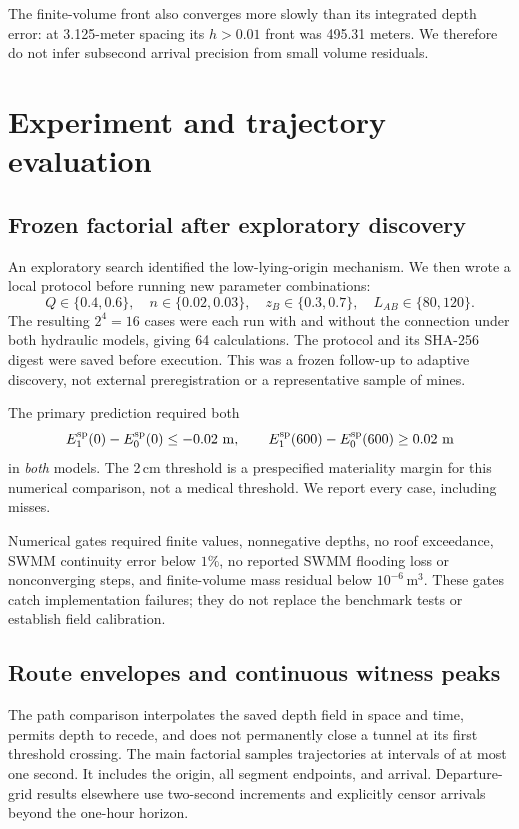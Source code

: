 \documentclass[11pt]{article}
\begin{document}
The finite-volume front also converges more slowly than its integrated depth error: at 3.125-meter spacing its \(h>0.01\) front was 495.31 meters. We therefore do not infer subsecond arrival precision from small volume residuals.

\section{Experiment and trajectory evaluation}
\subsection{Frozen factorial after exploratory discovery}
An exploratory search identified the low-lying-origin mechanism. We then wrote a local protocol before running new parameter combinations:
\[
 Q\in\{0.4,0.6\},\quad n\in\{0.02,0.03\},\quad
 z_B\in\{0.3,0.7\},\quad L_{AB}\in\{80,120\}.
\]
The resulting \(2^4=16\) cases were each run with and without the connection under both hydraulic models, giving 64 calculations. The protocol and its SHA-256 digest were saved before execution. This was a frozen follow-up to adaptive discovery, not external preregistration or a representative sample of mines.

The primary prediction required both
\begin{equation}
 E_1^{\rm sp}(0)-E_0^{\rm sp}(0)\leq-0.02\ {\rm m},
 \qquad
 E_1^{\rm sp}(600)-E_0^{\rm sp}(600)\geq0.02\ {\rm m}       \label{eq:criterion}
\end{equation}
in \emph{both} models. The 2\,cm threshold is a prespecified materiality margin for this numerical comparison, not a medical threshold. We report every case, including misses.

Numerical gates required finite values, nonnegative depths, no roof exceedance, SWMM continuity error below \(1\%\), no reported SWMM flooding loss or nonconverging steps, and finite-volume mass residual below \(10^{-6}\,\mathrm{m^3}\). These gates catch implementation failures; they do not replace the benchmark tests or establish field calibration.

\subsection{Route envelopes and continuous witness peaks}
The path comparison interpolates the saved depth field in space and time, permits depth to recede, and does not permanently close a tunnel at its first threshold crossing. The main factorial samples trajectories at intervals of at most one second. It includes the origin, all segment endpoints, and arrival. Departure-grid results elsewhere use two-second increments and explicitly censor arrivals beyond the one-hour horizon.
\end{document}
